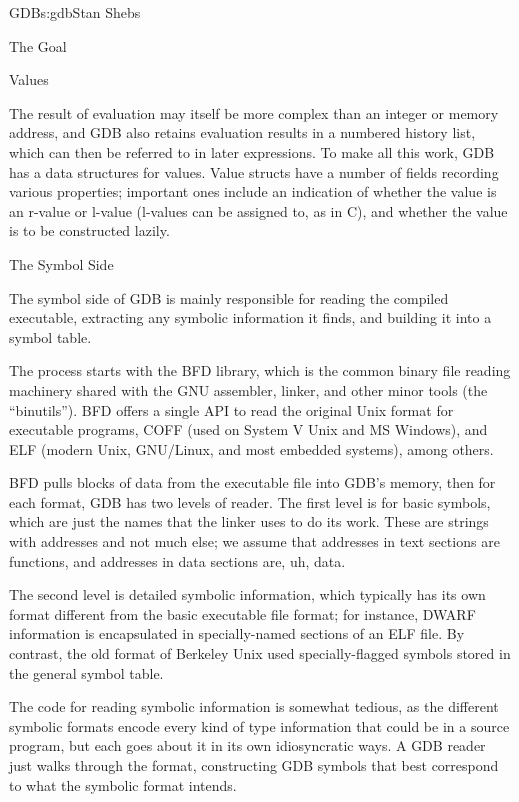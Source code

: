 \begin{aosachapter}{GDB}{s:gdb}{Stan Shebs}
\begin{aosasect1}{The Goal}
\begin{aosasect2}{Values}

The result of evaluation may itself be more complex than an integer or
memory address, and GDB also retains evaluation results in a numbered
history list, which can then be referred to in later expressions.  To
make all this work, GDB has a data structures for values.  Value
structs have a number of fields recording various properties;
important ones include an indication of whether the value is an
r-value or l-value (l-values can be assigned to, as in C), and whether
the value is to be constructed lazily.

\end{aosasect2}

\begin{aosasect1}{The Symbol Side}

The symbol side of GDB is mainly responsible for reading the compiled
executable, extracting any symbolic information it finds, and building
it into a symbol table.

The process starts with the BFD library, which is the common binary
file reading machinery shared with the GNU assembler, linker, and
other minor tools (the ``binutils'').  BFD offers a single API to read
the original Unix  format for executable programs, COFF (used on
System V Unix and MS Windows), and ELF (modern Unix, GNU/Linux, and
most embedded systems), among others.

BFD pulls blocks of data from the executable file into GDB's memory,
then for each format, GDB has two levels of reader.  The first level
is for basic symbols, which are just the names that the linker uses to
do its work.  These are strings with addresses and not much else; we
assume that addresses in text sections are functions, and addresses in
data sections are, uh, data.

The second level is detailed symbolic information, which typically has
its own format different from the basic executable file format; for
instance, DWARF information is encapsulated in specially-named
sections of an ELF file.  By contrast, the old  format of
Berkeley Unix used specially-flagged symbols stored in the general
symbol table.

The code for reading symbolic information is somewhat tedious, as the
different symbolic formats encode every kind of type information that
could be in a source program, but each goes about it in its own
idiosyncratic ways.  A GDB reader just walks through the format,
constructing GDB symbols that best correspond to what the symbolic
format intends.


\end{aosasect1}
\end{aosasect1}
\end{aosachapter}
